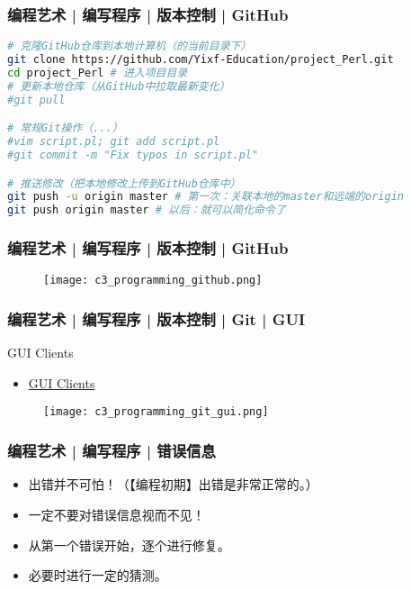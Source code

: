 \begin{frame}[fragile]
  \frametitle{编程艺术 | 编写程序 | 版本控制 | GitHub}
  \vspace{-1.5em}
\begin{lstlisting}[language=sh]
# 克隆GitHub仓库到本地计算机（的当前目录下）
git clone https://github.com/Yixf-Education/project_Perl.git
cd project_Perl # 进入项目目录
# 更新本地仓库（从GitHub中拉取最新变化）
#git pull

# 常规Git操作（...）
#vim script.pl; git add script.pl
#git commit -m "Fix typos in script.pl" 

# 推送修改（把本地修改上传到GitHub仓库中）
git push -u origin master # 第一次：关联本地的master和远端的origin
git push origin master # 以后：就可以简化命令了
\end{lstlisting}
\end{frame}

\begin{frame}
  \frametitle{编程艺术 | 编写程序 | 版本控制 | GitHub}
  \begin{figure}
    \centering
    \texttt{[image: c3\_programming\_github.png]}
  \end{figure}
\end{frame}

\begin{frame}
  \frametitle{编程艺术 | 编写程序 | 版本控制 | Git | GUI}
  \begin{block}{GUI Clients}
    \begin{itemize}
      \item \href{https://git-scm.com/downloads/guis}{GUI Clients}
    \end{itemize}
  \end{block}
  \begin{figure}
    \centering
    \texttt{[image: c3\_programming\_git\_gui.png]}
  \end{figure}
\end{frame}

\begin{frame}
  \frametitle{编程艺术 | 编写程序 | 错误信息}
  \begin{itemize}
    \item 出错并不可怕！（【编程初期】出错是非常正常的。）
    \item 一定不要对错误信息视而不见！
    \item 从第一个错误开始，逐个进行修复。
    \item 必要时进行一定的猜测。
  \end{itemize}
\end{frame}

